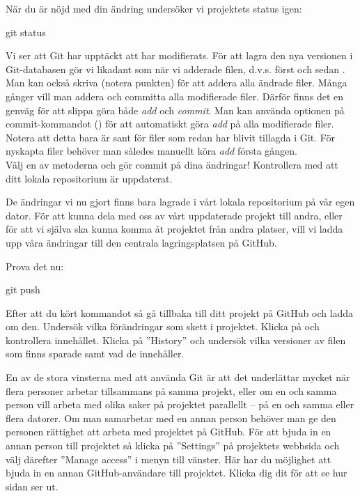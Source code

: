 \begin{Datorarbete}
	När du är nöjd med din ändring undersöker vi projektets status igen:

	\begin{Code}
		git status
	\end{Code}

	Vi ser att Git har upptäckt att  har modifierats. För att lagra den nya versionen i Git-databasen gör vi likadant som när vi adderade filen, d.v.s. först  och sedan . Man kan också skriva   (notera punkten) för att addera alla ändrade filer.	Många gånger vill man addera och committa alla modifierade filer. Därför finns det en genväg för att slippa göra både \emph{add} och \emph{commit}. Man kan använda optionen  på commit-kommandot () för att automatiskt göra \emph{add} på alla modifierade filer. Notera att detta bara är sant för filer som redan har blivit tillagda i Git. För nyskapta filer behöver man således manuellt köra \emph{add} första gången.
	\\

	\code{[\ref{git-commit-a}]} Välj en av metoderna och gör commit på dina ändringar! Kontrollera med  att ditt lokala repositorium är uppdaterat.
	\\

	\item De ändringar vi nu gjort finns bara lagrade i vårt lokala repositorium på vår egen dator. För att kunna dela med oss av vårt uppdaterade projekt till andra, eller för att vi själva ska kunna komma åt projektet från andra platser, vill vi ladda upp våra ändringar till den centrala lagringsplatsen på GitHub.

	Prova det nu:

	\begin{Code}
		git push
	\end{Code}

	Efter att du kört kommandot så gå tillbaka till ditt projekt på GitHub och ladda om den. Undersök vilka förändringar som skett i projektet. Klicka på  och kontrollera innehållet. Klicka på ''History'' och undersök vilka versioner av filen som finns sparade samt vad de innehåller.

	\item En av de stora vinsterna med att använda Git är att det underlättar mycket när flera personer arbetar tillsammans på samma projekt, eller om en och samma person vill arbeta med olika saker på projektet parallellt -- på en och samma eller flera datorer. Om man samarbetar med en annan person behöver man ge den personen rättighet att arbeta med projektet på GitHub. För att bjuda in en annan person till projektet så klicka på ''Settings'' på projektets webbsida och välj därefter ''Manage access'' i menyn till vänster. Här har du möjlighet att bjuda in en annan GitHub-användare till projektet. Klicka dig dit för att se hur sidan ser ut.


\end{Datorarbete}
